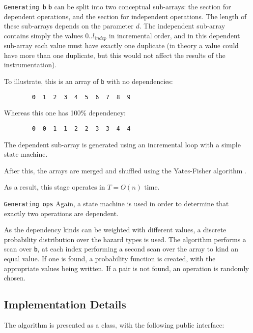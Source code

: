 		\texttt{Generating \texttt{b}} \label{sec:methodology/params/algo/gen-b}
		\texttt{b} can be split into two conceptual sub-arrays: the section for dependent operations, and the section for independent operations. The length of these sub-arrays depends on the parameter $d$. The independent sub-array contains simply the values $0..l_{indep}$ in incremental order, and in this dependent sub-array each value must have exactly one duplicate (in theory a value could have more than one duplicate, but this would not affect the results of the instrumentation).
		
		To illustrate, this is an array of \texttt{b} with no dependencies:
		
		\begin{verbatim}
		0  1  2  3  4  5  6  7  8  9
		\end{verbatim}
		
		Whereas this one has 100\% dependency:
		
		\begin{verbatim}
		0  0  1  1  2  2  3  3  4  4
		\end{verbatim}
		
		The dependent sub-array is generated using an incremental loop with a simple state machine.
		
		After this, the arrays are merged and shuffled using the Yates-Fisher algorithm \citep[p.~145]{TAOCPvol2}.
		
		As a result, this stage operates in $T=O(n)$ time.
		
		\texttt{Generating \texttt{ops}} \label{sec:methodology/params/algo/gen-ops}
		Again, a state machine is used in order to determine that exactly two operations are dependent.
		
		As the dependency kinds can be weighted with different values, a discrete probability distribution over the hazard types is used. The algorithm performs a scan over \texttt{b}, at each index performing a second scan over the array to kind an equal value. If one is found, a probability function is created, with the appropriate values being written. If a pair is not found, an operation is randomly chosen.
	
	\subsection{Implementation Details} \label{sec:methodology/params/implementation}
	The algorithm is presented as a class, with the following public interface:
	
